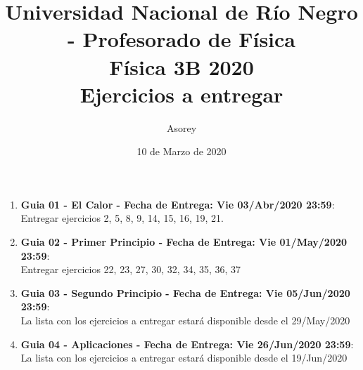\documentclass[a4paper,12pt]{article}
\begin{document}
\title{
{\normalsize{Universidad Nacional de Río Negro - Profesorado de Física}}\\
Física 3B 2020\\ Ejercicios a entregar}
\author{Asorey}
\date{10 de Marzo de 2020}
\maketitle

\begin{enumerate}
	\item {\bf{Guia 01 - El Calor - Fecha de Entrega: Vie 03/Abr/2020 23:59}}:\\
		Entregar ejercicios 2, 5, 8, 9, 14, 15, 16, 19, 21.
	\item {\bf{Guia 02 - Primer Principio - Fecha de Entrega: Vie 01/May/2020 23:59}}:\\		
		Entregar ejercicios 22, 23, 27, 30, 32, 34, 35, 36, 37
	\item {\bf{Guia 03 - Segundo Principio - Fecha de Entrega: Vie 05/Jun/2020 23:59}}:\\		
		La lista con los ejercicios a entregar estará disponible desde el 29/May/2020
	\item {\bf{Guia 04 - Aplicaciones - Fecha de Entrega: Vie 26/Jun/2020 23:59}}:\\		
		La lista con los ejercicios a entregar estará disponible desde el 19/Jun/2020
\end{enumerate}
\end{document}
